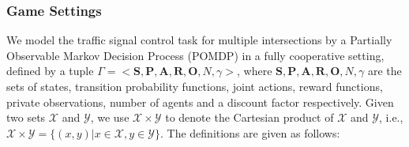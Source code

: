 \subsubsection{Game Settings}
We model the traffic signal control task for multiple intersections by a Partially Observable Markov Decision Process (POMDP) in a fully cooperative setting, defined by a tuple $\Gamma=<\pmb{S},\pmb{P},\pmb{A},\pmb{R},\pmb{O},\mathit{N},\gamma>$, where $\pmb{S},\pmb{P},\pmb{A},\pmb{R},\pmb{O},\mathit{N},\gamma$ are the sets of states, transition probability functions, joint actions, reward functions, private observations, number of agents and a discount factor respectively. Given two sets $\mathcal{X}$ and $\mathcal{Y}$, we use $\mathcal{X}\times \mathcal{Y}$ to denote the Cartesian product of $\mathcal{X}$ and $\mathcal{Y}$, i.e., $\mathcal{X}\times \mathcal{Y}=\{ (x,y ) | x\in \mathcal{X},  y\in\mathcal{Y}\}$. The definitions are given as follows:
